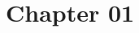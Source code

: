 \documentclass[../main]{subfiles}
\begin{document}
\setcounter{chapter}{0}

\chapter{Chapter 01}



\end{document}
